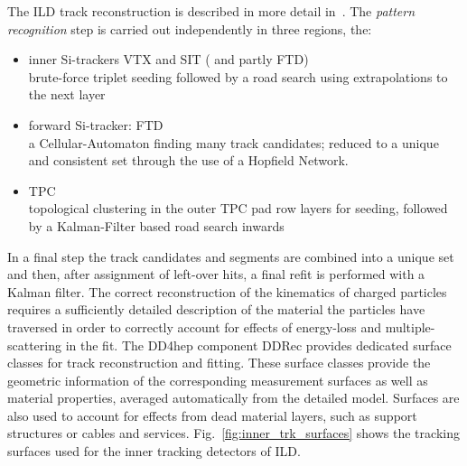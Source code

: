 The ILD track reconstruction is described in more detail in~\cite{Gaede:2014aza}. The \emph{pattern recognition}
step is carried out independently in three regions, the:
\begin{itemize}
\item inner Si-trackers  VTX and SIT ( and partly FTD)\\
  brute-force triplet seeding followed by a road search using extrapolations to the next layer
\item forward Si-tracker: FTD \\
  a Cellular-Automaton finding many track candidates; reduced to a unique and consistent set through the use of a Hopfield Network.
\item TPC \\
  topological clustering in the outer TPC pad row layers for seeding, followed by a Kalman-Filter based road search inwards
\end{itemize}
In a final step the track candidates and segments are combined into a unique set and then, after assignment of left-over hits, a final
refit is performed with a Kalman filter.
%
The correct reconstruction of the kinematics of charged particles requires a sufficiently detailed description of the material
the particles have traversed in order to correctly account for effects of energy-loss and multiple-scattering in the fit.
The DD4hep component DDRec provides dedicated surface classes for track reconstruction and fitting. These surface classes provide the
geometric information of the corresponding measurement surfaces as well as material properties, averaged automatically from
the detailed model. Surfaces are also used to account for effects from dead material layers, such as support structures or cables and services.
Fig.~\ref{fig:inner_trk_surfaces} shows the tracking surfaces used for the inner tracking detectors of ILD.
%
